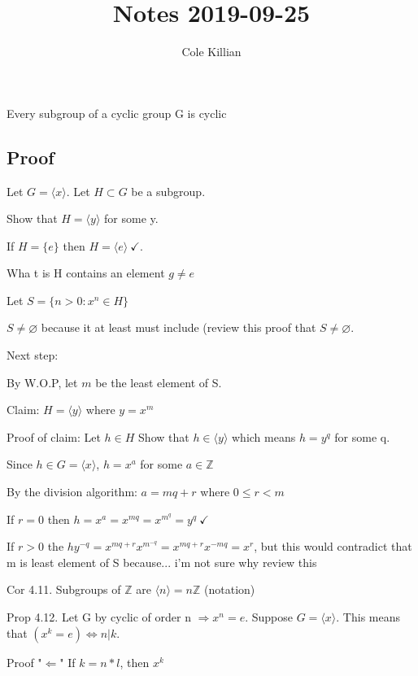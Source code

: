 \documentclass[class=scrartcl, crop=false]{standalone}
\begin{document}
\title{Notes 2019-09-25}
\author{Cole Killian}

\begin{theorem}
Every subgroup of a cyclic group G is cyclic
\end{theorem}

\subsection{Proof}
Let $G = \langle x\rangle.$ Let $H \subset G$ be a subgroup.

Show that $H = \langle y\rangle$ for some y.

If $H = \{e\}$ then $H = \langle e\rangle \ \checkmark$.

Wha t is H contains an element $g \neq e$

Let $S = \{n > 0: x^n \in H\}$ 

$S \neq \varnothing$ because it at least must include (review this proof that $S \neq \varnothing$.

Next step:

By W.O.P, let $m$ be the least element of S.

Claim: $H = \langle y\rangle$ where $y = x^m$ 

Proof of claim: Let $h \in H$ Show that $h \in \langle y\rangle$ which means $h = y^q$ for some q.

Since $h \in G = \langle x\rangle$, $h = x^a$ for some $a \in \mathbb{Z}$

By the division algorithm: $a = mq + r$ where $0 \leq r < m$

If  $r = 0$ then $h = x^a = x^{mq} = x^{m^q} = y^q \ \checkmark$

If $r > 0$ the $hy^{-q} = x^{mq + r}x^{m^{-q}} = x^{mq + r}x^{-mq} = x^r$, but this would contradict that m is least element of S because... i'm not sure why review this

Cor 4.11. Subgroups of $\mathbb{Z}$ are $\langle n\rangle = n\mathbb{Z}$ (notation)

Prop 4.12. Let G by cyclic of order n $\Rightarrow x^n = e$. Suppose $G = \langle x\rangle$. This means that $(x^k = e) \Leftrightarrow n | k$.

Proof "$\Leftarrow$" If  $k = n * l$, then $x^k$
\end{document}
